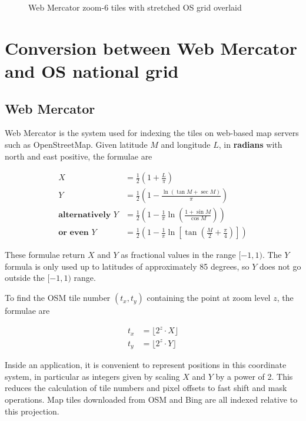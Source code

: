 \documentclass[10pt,a4paper]{article}
\def\tkname#1{}
\begin{document}
\begin{figure}[t]
  \centering
  \tkname{grid_os}
  \fbox{
    
  }
  \caption{Web Mercator zoom-6 tiles with stretched OS grid overlaid}
  \label{fig:grid_os}
\end{figure}

\section {Conversion between Web Mercator and OS national grid}

\subsection {Web Mercator}
Web Mercator is the system used for indexing the tiles on web-based map servers
such as OpenStreetMap.  Given latitude $M$ and longitude $L$, in
\textbf{radians} with north and east positive, the formulae are 

\begin{align}
  X & = \frac{1}{2}\left(1 + \frac{L}{\pi} \right) \label{eqn:wmx} \\
  Y & = \frac{1}{2}\left(1 - \frac{
       \ln\left(\tan{M} + \sec{M}\right)
     }{\pi} \right) \label{eqn:wmy} \\
    \textbf{alternatively } Y & = \frac{1}{2} \left(
        1 - \frac{1}{\pi} \ln \left(
          \frac{1 + \sin{M}}{\cos{M}}
        \right)
        \right) \\
    \textbf{or even } Y & = \frac{1}{2} \left(
        1 - \frac{1}{\pi} \ln \left[
          \tan\left(\frac{M}{2} + \frac{\pi}{4}\right)
        \right]
        \right)
\end{align}

These formulae return $X$ and $Y$ as fractional values in the range $[-1,1)$.
The $Y$ formula is only used up to latitudes of approximately 85 degrees, so
$Y$ does not go outside the $[-1,1)$ range.

To find the OSM tile number $(t_x,t_y)$ containing the point at zoom level $z$,
the formulae are

\begin{align}
  t_x &= \lfloor 2^z \cdot X \rfloor \\
  t_y &= \lfloor 2^z \cdot Y \rfloor
\end{align}

Inside an application, it is convenient to represent positions in this
coordinate system, in particular as integers given by scaling $X$ and $Y$ by a
power of 2.  This reduces the calculation of tile numbers and pixel offsets to
fast shift and mask operations.  Map tiles downloaded from OSM and Bing are all
indexed relative to this projection.
\end{document}
